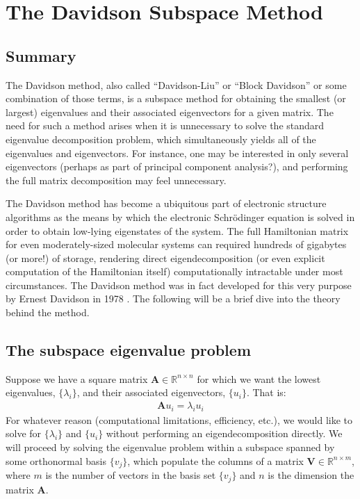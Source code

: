 \documentclass[12pt, fleqn]{article}
\begin{document}
\section*{The Davidson Subspace Method}
\subsection*{Summary}
\label{subsec:Summary}
The Davidson method, also called ``Davidson-Liu'' or ``Block Davidson'' or some combination of those terms, is a subspace method for obtaining the smallest (or largest) eigenvalues and their associated eigenvectors for a given matrix.
The need for such a method arises when it is unnecessary to solve the standard eigenvalue decomposition problem, which simultaneously yields all of the eigenvalues and eigenvectors. 
For instance, one may be interested in only several eigenvectors (perhaps as part of principal component analysis?), and performing the full matrix decomposition may feel unnecessary. \newline

\noindent The Davidson method has become a ubiquitous part of electronic structure algorithms as the means by which the electronic Schr\"odinger equation is solved in order to obtain low-lying eigenstates of the system. 
The full Hamiltonian matrix for even moderately-sized molecular systems can required hundreds of gigabytes (or more!) of storage, rendering direct eigendecomposition (or even explicit computation of the Hamiltonian itself) computationally intractable under most circumstances.
The Davidson method was in fact developed for this very purpose by Ernest Davidson in 1978 \cite{Davidson1983}.
The following will be a brief dive into the theory behind the method. 

\subsection*{The subspace eigenvalue problem}
Suppose we have a square matrix $\mathbf{A} \in \mathbb{R}^{n \times n}$ for which we want the lowest eigenvalues, $\{\lambda_i\}$, and their associated eigenvectors, $\{u_i\}$. 
That is:
\begin{align}
    \mathbf{A} u_i = \lambda_i u_i 
\end{align}
For whatever reason (computational limitations, efficiency, etc.), we would like to solve for $\{\lambda_i\}$ and $\{u_i\}$ without performing an eigendecomposition directly. 
We will proceed by solving the eigenvalue problem within a subspace spanned by some orthonormal basis $\{v_j\}$, which populate the columns of a matrix $\mathbf{V} \in \mathbb{R}^{n \times m}$, where $m$ is the number of vectors in the basis set $\{v_j\}$ and $n$ is the dimension the matrix $\mathbf{A}$. \newline
\end{document}
